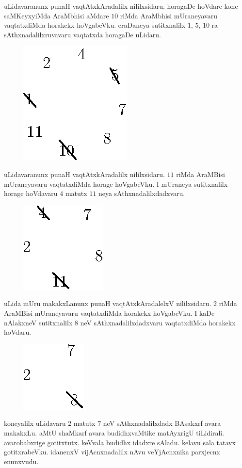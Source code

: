 uLidavaranunx punaH vaqtAtxkAradalilx nililxsidaru. horagaDe hoVdare kone saMKeyxyiMda AraMbhisi aMdare $10$ riMda AraMbhisi mUraneyavaru vaqtatxdiMda horakekx hoVgabeVku. eraDaneya sutitxnalilx $1$, $5$, $10$ ra sAthxnadalilxruvavaru vaqtatxda horagaDe uLidaru.
\begin{figure}[H]
\centering
\includegraphics{src/figures/fig3.eps}
\end{figure}

uLidavaranunx punaH vaqtAtxkAradalilx nililxsidaru. $11$ riMda AraMBisi mUraneyavaru vaqtatxdiMda horage hoVgabeVku. I mUraneya sutitxnalilx horage hoVdavaru $4$ matutx $11$ neya sAthxnadalilxdadxvaru. 
\begin{figure}[H]
\centering
\includegraphics{src/figures/fig4.eps}
\end{figure}

uLida mUru makakxLanunx punaH vaqtAtxkAradalelxV nililxsidaru. $2$ riMda AraMBisi mUraneyavaru vaqtatxdiMda horakekx hoVgabeVku. I kaDe nAlakxneV sutitxnalilx $8$ neV sAthxnadalilxdadxvaru vaqtatxdiMda horakekx hoVdaru.
\begin{figure}[H]
\centering
\includegraphics{src/figures/fig5.eps}
\end{figure}

koneyalilx uLidavaru $2$ matutx $7$ neV sAthxnadalilxdadx BAsakxrf avara makakxLu. aMtU shaMkarf avara budidhxvaMtike matAyxrigU tiLidirali. avarobabxrige gotitxtutx. keVvala budidhx idadxre sAladu. kelavu sala tatavx gotitxrabeVku. idanenxV vijAcnxnadalilx nAvu veYjAcnxnika parxjecnx enunxvudu. 
